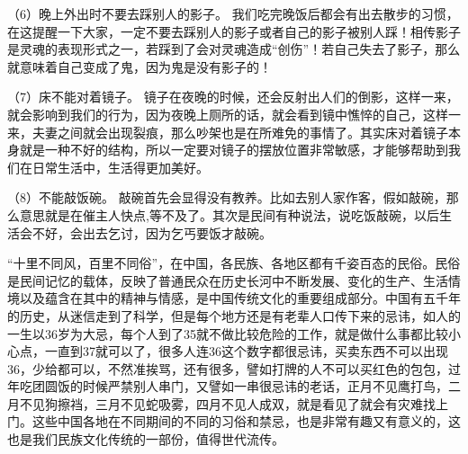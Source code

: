    （6）晚上外出时不要去踩别人的影子。
   我们吃完晚饭后都会有出去散步的习惯，在这提醒一下大家，一定不要去踩别人的影子或者自己的影子被别人踩！相传影子是灵魂的表现形式之一，若踩到了会对灵魂造成“创伤”！若自己失去了影子，那么就意味着自己变成了鬼，因为鬼是没有影子的！

   （7）床不能对着镜子。
   镜子在夜晚的时候，还会反射出人们的倒影，这样一来，就会影响到我们的行为，因为夜晚上厕所的话，就会看到镜中憔悴的自己，这样一来，夫妻之间就会出现裂痕，那么吵架也是在所难免的事情了。其实床对着镜子本身就是一种不好的结构，所以一定要对镜子的摆放位置非常敏感，才能够帮助到我们在日常生活中，生活得更加美好。

   （8）不能敲饭碗。
   敲碗首先会显得没有教养。比如去别人家作客，假如敲碗，那么意思就是在催主人快点,等不及了。其次是民间有种说法，说吃饭敲碗，以后生活会不好，会出去乞讨，因为乞丐要饭才敲碗。



   “十里不同风，百里不同俗”，在中国，各民族、各地区都有千姿百态的民俗。民俗是民间记忆的载体，反映了普通民众在历史长河中不断发展、变化的生产、生活情境以及蕴含在其中的精神与情感，是中国传统文化的重要组成部分。中国有五千年的历史，从迷信走到了科学，但是每个地方还是有老辈人口传下来的忌讳，如人的一生以36岁为大忌，每个人到了35就不做比较危险的工作，就是做什么事都比较小心点，一直到37就可以了，很多人连36这个数字都很忌讳，买卖东西不可以出现36，少给都可以，不然准挨骂，还有很多，譬如打牌的人不可以买红色的包包，过年吃团圆饭的时候严禁别人串门，又譬如一串很忌讳的老话，正月不见鹰打鸟，二月不见狗擦裆，三月不见蛇吸雾，四月不见人成双，就是看见了就会有灾难找上门。这些中国各地在不同期间的不同的习俗和禁忌，也是非常有趣又有意义的，这也是我们民族文化传统的一部份，值得世代流传。
